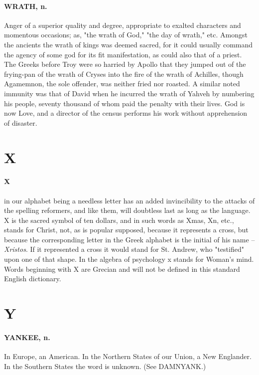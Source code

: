 \documentclass[11pt]{article}
\begin{document}
\paragraph{WRATH, n.}  Anger of a superior quality and degree, appropriate to
exalted characters and momentous occasions; as, "the wrath of God,"
"the day of wrath," etc.  Amongst the ancients the wrath of kings was
deemed sacred, for it could usually command the agency of some god for
its fit manifestation, as could also that of a priest.  The Greeks
before Troy were so harried by Apollo that they jumped out of the
frying-pan of the wrath of Cryses into the fire of the wrath of
Achilles, though Agamemnon, the sole offender, was neither fried nor
roasted.  A similar noted immunity was that of David when he incurred
the wrath of Yahveh by numbering his people, seventy thousand of whom
paid the penalty with their lives.  God is now Love, and a director of
the census performs his work without apprehension of disaster.



\section*{X}



\paragraph{X} in our alphabet being a needless letter has an added invincibility
to the attacks of the spelling reformers, and like them, will
doubtless last as long as the language.  X is the sacred symbol of ten
dollars, and in such words as Xmas, Xn, etc., stands for Christ, not,
as is popular supposed, because it represents a cross, but because the
corresponding letter in the Greek alphabet is the initial of his name
-- {\em Xristos}.  If it represented a cross it would stand for St.
Andrew, who "testified" upon one of that shape.  In the algebra of
psychology x stands for Woman's mind.  Words beginning with X are
Grecian and will not be defined in this standard English dictionary.



\section*{Y}



\paragraph{YANKEE, n.}  In Europe, an American.  In the Northern States of our
Union, a New Englander.  In the Southern States the word is unknown.
(See DAMNYANK.)
\end{document}
